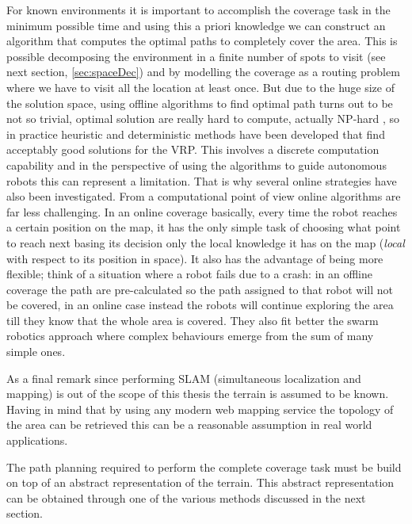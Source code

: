 For known environments it is important to accomplish the coverage task in the minimum possible time and using this a priori knowledge we can construct an algorithm that computes the optimal paths to completely cover the area. This is possible decomposing the environment in a finite number of spots to visit (see next section, \ref{sec:spaceDec}) and by modelling the coverage as a routing problem where we have to visit all the location at least once. But due to the huge size of the solution space, using offline algorithms to find optimal path turns out to be not so trivial, optimal solution are really hard to compute, actually NP-hard \cite{wiki:VRP}, so in practice heuristic and deterministic methods have been developed that find acceptably good solutions for the VRP. This involves a discrete computation capability and in the perspective of using the algorithms to guide autonomous robots this can represent a limitation. That is why several online strategies have also been investigated.
From a computational point of view online algorithms are far less challenging. In an online coverage basically, every time the robot reaches a certain position on the map, it has the only simple task of choosing what point to reach next basing its decision only the local knowledge it has on the map (\emph{local} with respect to its position in space). It also has the advantage of being more flexible; think of a situation where a robot fails due to a crash: in an offline coverage the path are pre-calculated so the path assigned to that robot will not be covered, in an online case instead the robots will continue exploring the area till they know that the whole area is covered. They also fit better the swarm robotics approach where complex behaviours emerge from the sum of many simple ones.

As a final remark since performing SLAM (simultaneous localization and mapping) is out of the scope of this thesis the terrain is assumed to be known. Having in mind that by using any modern web mapping service the topology of the area can be retrieved this can be a reasonable assumption in real world applications.

The path planning required to perform the complete coverage task must be build on top of an abstract representation of the terrain. This abstract representation can be obtained through one of the various methods discussed in the next section.

